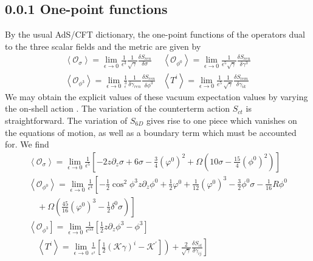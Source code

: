\documentclass{article}
\begin{document}
\subsection*{0.0.1 One-point functions}
By the usual AdS/CFT dictionary, the one-point functions of the operators dual to the three scalar fields and the metric are given by
\[
\begin{array}{ll}
\left\langle \mathcal{O}_{\sigma}\right\rangle=\lim _{\epsilon \rightarrow 0} \frac{1}{\epsilon^{3}} \frac{1}{\sqrt{\gamma}} \frac{\delta S_{r e n}}{\delta \sigma} & \left\langle \mathcal{O}_{\phi^{0}}\right\rangle=\lim _{\epsilon \rightarrow 0} \frac{1}{\left.\epsilon^{5} \sqrt{\gamma}} \frac{\delta S_{r e n}}{\delta \gamma^{3}} \\
\left\langle \mathcal{O}_{\phi^{3}}\right\rangle=\lim _{\epsilon \rightarrow 0} \frac{1}{{ }_{\epsilon}^{3}} \frac{1}{\delta \gamma_{r e n}} \frac{\delta S_{r e n}}{\delta \phi^{3}} & \left\langle T^{i}\right\rangle=\lim _{\epsilon \rightarrow 0} \frac{1}{e^{5}} \frac{1}{\sqrt{\gamma}} \frac{\delta S_{r e m}}{\delta \gamma_{i k}}
\end{array}
\]
We may obtain the explicit values of these vacuum expectation values by varying the on-shell action . The variation of the counterterm action \(S_{c t}\) is straightforward. The variation of \(S_{6 D}\) gives rise to one piece which vanishes on the equations of motion, as well as a boundary term which must be accounted for. We find
\[
\begin{array}{l}
\left\langle \mathcal{O}_{\sigma}\right\rangle=\lim \limits _{\epsilon \rightarrow 0} \frac{1}{\epsilon^{5}}\left[-2 z \partial_{z} \sigma+6 \sigma-\frac{3}{4}\left(\varphi^{0}\right)^{2}+\Omega\left(10 \sigma-\frac{15}{4}\left(\phi^{0}\right)^{2}\right)\right] \\
\left\langle \mathcal{O}_{\phi^{0}}\right\rangle=\left.\lim _{\epsilon \rightarrow 0} \frac{1}{\epsilon^{4}}\left[-\frac{1}{2} \cos ^{2} \phi^{3} z \partial_{z} \phi^{0}+\frac{1}{2} \varphi^{0}+\frac{1}{12}\left(\varphi^{0}\right)^{3}-\frac{3}{2} \phi^{0} \sigma-\frac{1}{16} R \phi^{0}\right. \\
\left.\quad+\Omega\left(\frac{45}{16}\left(\varphi^{0}\right)^{3}-\frac{1}{2} \delta^{0} \sigma\right)\right] \\
\left\langle \mathcal{O}_{\phi^{3}}\right\rbrack=\left.\lim _{\epsilon \rightarrow 0} \frac{1}{\epsilon^{\alpha 3}}\left[\frac{1}{2} z \partial_{z} \phi^{3}-\phi^{3}\right]\right. \\
\left.\quad\left\langle T^{i}\right\rangle=\left.\lim _{\epsilon \rightarrow 0} \frac{1}{{ }_{\epsilon^{\beta}}} \left[\frac{1}{2}\left(\mathcal{K} \gamma\right)^{i}-\mathcal{K}^{\prime}\right]\right)+\frac{2}{\sqrt{\gamma}} \frac{\delta S_{c t}}{\delta \gamma_{i j}}\right]
\end{array}
\]
\end{document}
